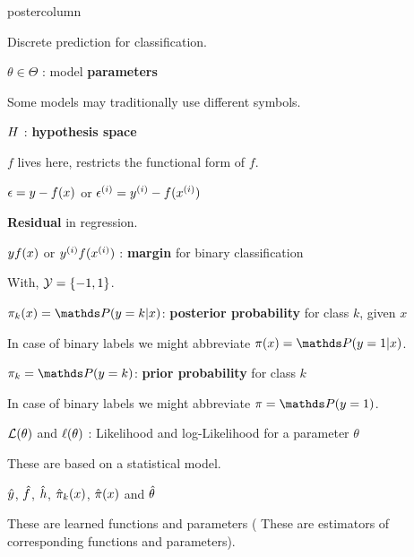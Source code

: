 \documentclass{beamer}
\begin{document}
\begin{frame}[fragile]{}
\begin{columns}
\begin{column}{.31\textwidth}
\begin{beamercolorbox}[center]{postercolumn}
\begin{minipage}{.98\textwidth}
{\begin{myblock}{}
						\hspace*{1ex}Discrete prediction for classification.
						\\
						\begin{codebox}
							$\theta \in \Theta$ : model \textbf{parameters}
						\end{codebox}
						\hspace*{1ex}Some models may traditionally use different symbols.
						\\
						\begin{codebox}
							$H$ : \textbf{hypothesis space}
						\end{codebox}
						\hspace*{1ex}$f$ lives here, restricts the functional form of $f$.
						\\
						\begin{codebox}
				            $\epsilon = y - f(x)$ or $\epsilon^{(i)} = y^{(i)} - f(x^{(i)})$
						\end{codebox}
						\hspace*{1ex}\textbf{Residual} in regression.
						\\
						\begin{codebox}
				             $y f(x)$ or $y^{(i)} f(x^{(i)})$ : \textbf{margin} for binary classification
						\end{codebox}
						\hspace*{1ex}With, $\mathcal{Y} = \{-1, 1\}$.
						\\
						\begin{codebox} $\pikx = \postk$: \textbf{posterior probability} for class $k$, given $x$
						\end{codebox}
						\hspace*{1ex}In case of binary labels we might abbreviate $\pix = \post$.
						\\
						\begin{codebox}
						$\pi_k = \P(y = k)$:\textbf{ prior probability} for class $k$
						\end{codebox}
						\hspace*{1ex}In case of binary labels we might abbreviate $\pi = \P(y = 1)$.
						\\
						\begin{codebox}
						$\mathcal{L}(\theta)$ and $\ell(\theta)$ : Likelihood and log-Likelihood for a parameter $\theta$
						\end{codebox}
						\hspace*{1ex}These are based on a statistical model.
						\\
						\begin{codebox}
						 $\hat{y}$, $\hat{f}$, $\hat{h}$, $\hat \pi_k(x)$, $\hat \pi(x)$ and $\hat{\theta}$
						\end{codebox}
						\hspace*{1ex}These are learned functions and parameters ( These are estimators of \hspace*{1ex}corresponding functions and parameters).\\
						

\end{myblock}}
\end{minipage}
\end{beamercolorbox}
\end{column}
\end{columns}
\end{frame}
\end{document}
